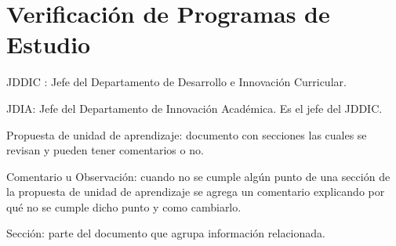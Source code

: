 \section{Verificación de Programas de Estudio}
JDDIC : Jefe del Departamento de Desarrollo e Innovación Curricular.

JDIA: Jefe del Departamento de Innovación Académica. Es el jefe del JDDIC.

Propuesta de unidad de aprendizaje: documento con secciones las cuales se revisan y pueden tener comentarios o no.

Comentario u Observación: cuando no se cumple algún punto de una sección de la propuesta de unidad de aprendizaje se agrega un comentario explicando por qué no se cumple dicho punto y como cambiarlo.

Sección: parte del documento que agrupa información relacionada.

